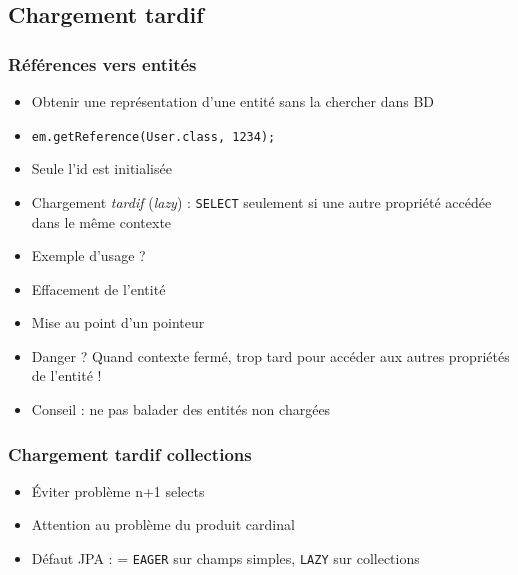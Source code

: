 \documentclass[english, french]{beamer}
\begin{document}
\subsection{Chargement tardif}
\begin{frame}
	\frametitle{Références vers entités}
	\begin{itemize}
		\item Obtenir une représentation d’une entité sans la chercher dans BD
		\item \texttt{em.getReference(User.class, 1234);}
		\item Seule l’id est initialisée
		\item Chargement \emph{tardif} (\emph{lazy}) : \texttt{SELECT} seulement si une autre propriété accédée {\tiny dans le même contexte}
		\item Exemple d’usage ? \pause
		\item Effacement de l’entité
		\item Mise au point d’un pointeur \pause
		\item Danger ? \pause Quand contexte fermé, trop tard pour accéder aux autres propriétés de l’entité !
		\item Conseil : ne pas balader des entités non chargées
	\end{itemize}
\end{frame}

\begin{frame}
	\frametitle{Chargement tardif collections}
	\begin{itemize}
		\item Éviter problème n+1 selects %
		\item Attention au problème du produit cardinal
		\item Défaut JPA :  = \texttt{EAGER} sur champs simples, \texttt{LAZY} sur collections
	\end{itemize}
\end{frame}
\end{document}
